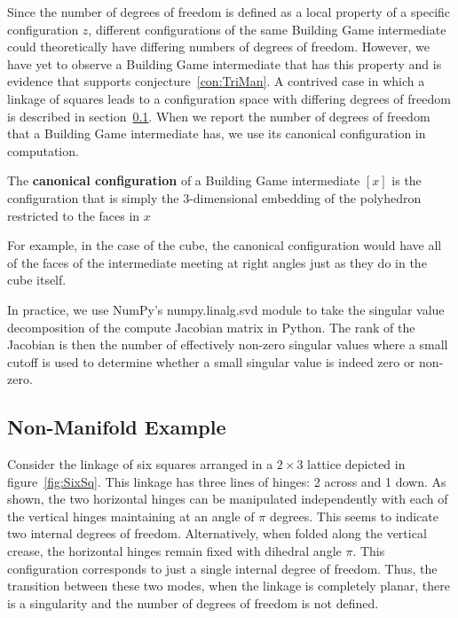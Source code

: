 Since the number of degrees of freedom is defined as a local property of a specific configuration $z$, different configurations of the same Building Game intermediate could theoretically have differing numbers of degrees of freedom. However, we have yet to observe a Building Game intermediate that has this property and is evidence that supports conjecture~\ref{con:TriMan}. A contrived case in which a linkage of squares leads to a configuration space with differing degrees of freedom is described in section~\ref{ssc:NonMan}. When we report the number of degrees of freedom that a Building Game intermediate has, we use its canonical configuration in computation.
\begin{mydef}
The \textbf{canonical configuration} of a Building Game intermediate $[x]$ is the configuration that is simply the $3$-dimensional embedding of the polyhedron restricted to the faces in $x$
\end{mydef}
For example, in the case of the cube, the canonical configuration would have all of the faces of the intermediate  meeting at right angles just as they do in the cube itself. 

In practice, we use NumPy's numpy.linalg.svd module to take the singular value decomposition of the compute Jacobian matrix in Python. The rank of the Jacobian is then the number of effectively non-zero singular values where a small cutoff is used to determine whether a small singular value is indeed zero or non-zero.

\subsection{Non-Manifold Example}
\label{ssc:NonMan}

Consider the linkage of six squares arranged in a $2\times 3$ lattice depicted in figure~\ref{fig:SixSq}. This linkage has three lines of hinges: 2 across and 1 down. As shown, the two horizontal hinges can be manipulated independently with each of the vertical hinges maintaining at an angle of $\pi$ degrees. This seems to indicate two internal degrees of freedom. Alternatively, when folded along the vertical crease, the horizontal hinges remain fixed with dihedral angle $\pi$. This configuration corresponds to just a single internal degree of freedom. Thus, the transition between these two modes, when the linkage is completely planar, there is a singularity and the number of degrees of freedom is not defined. 

